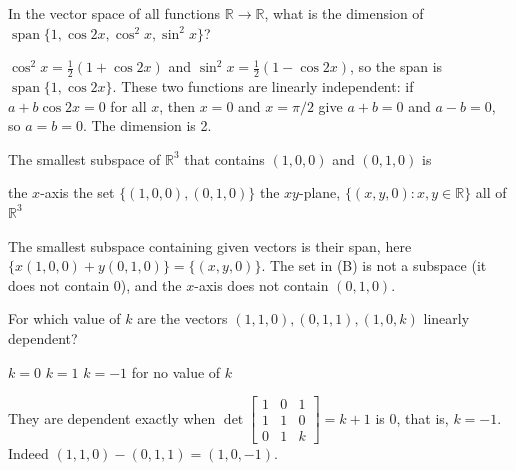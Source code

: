 \begin{question}[id=vs-19, marks=2]
In the vector space of all functions $\mathbb{R} \to \mathbb{R}$, what is the dimension of $\operatorname{span}\{1, \cos 2x, \cos^2 x, \sin^2 x\}$?
\begin{solution}
$\cos^2 x = \frac{1}{2}(1 + \cos 2x)$ and $\sin^2 x = \frac{1}{2}(1 - \cos 2x)$, so the span is $\operatorname{span}\{1, \cos 2x\}$. These two functions are linearly independent: if $a + b\cos 2x = 0$ for all $x$, then $x = 0$ and $x = \pi/2$ give $a + b = 0$ and $a - b = 0$, so $a = b = 0$. The dimension is 2.
\end{solution}
\end{question}

\begin{question}[id=vs-20]
The smallest subspace of $\mathbb{R}^3$ that contains $(1, 0, 0)$ and $(0, 1, 0)$ is
\begin{options}
  \option the $x$-axis
  \option the set $\{(1, 0, 0), (0, 1, 0)\}$
  \correct the $xy$-plane, $\{(x, y, 0) : x, y \in \mathbb{R}\}$
  \option all of $\mathbb{R}^3$
\end{options}
\begin{solution}
The smallest subspace containing given vectors is their span, here $\{x(1, 0, 0) + y(0, 1, 0)\} = \{(x, y, 0)\}$. The set in (B) is not a subspace (it does not contain 0), and the $x$-axis does not contain $(0, 1, 0)$.
\end{solution}
\end{question}


\begin{question}[id=basis-1]
For which value of $k$ are the vectors $(1, 1, 0), (0, 1, 1), (1, 0, k)$ linearly dependent?
\begin{options}
  \option $k = 0$
  \option $k = 1$
  \correct $k = -1$
  \option for no value of $k$
\end{options}
\begin{solution}
They are dependent exactly when $\det \begin{bmatrix} 1 & 0 & 1 \\ 1 & 1 & 0 \\ 0 & 1 & k \end{bmatrix} = k + 1$ is 0, that is, $k = -1$. Indeed $(1,1,0) - (0,1,1) = (1, 0, -1)$.
\end{solution}
\end{question}

